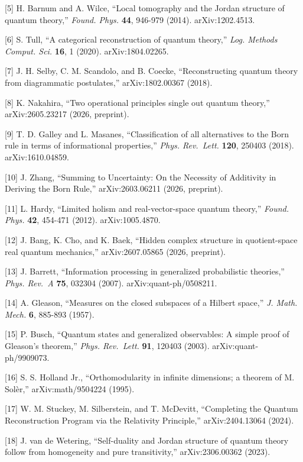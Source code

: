 \documentclass[
]{article}
\begin{document}
{[}5{]} H. Barnum and A. Wilce, ``Local tomography and the Jordan
structure of quantum theory,'' \emph{Found. Phys.} \textbf{44}, 946-979
(2014). arXiv:1202.4513.

{[}6{]} S. Tull, ``A categorical reconstruction of quantum theory,''
\emph{Log. Methods Comput. Sci.} \textbf{16}, 1 (2020).
arXiv:1804.02265.

{[}7{]} J. H. Selby, C. M. Scandolo, and B. Coecke, ``Reconstructing
quantum theory from diagrammatic postulates,'' arXiv:1802.00367 (2018).

{[}8{]} K. Nakahira, ``Two operational principles single out quantum
theory,'' arXiv:2605.23217 (2026, preprint).

{[}9{]} T. D. Galley and L. Masanes, ``Classification of all
alternatives to the Born rule in terms of informational properties,''
\emph{Phys. Rev.~Lett.} \textbf{120}, 250403 (2018). arXiv:1610.04859.

{[}10{]} J. Zhang, ``Summing to Uncertainty: On the Necessity of
Additivity in Deriving the Born Rule,'' arXiv:2603.06211 (2026,
preprint).

{[}11{]} L. Hardy, ``Limited holism and real-vector-space quantum
theory,'' \emph{Found. Phys.} \textbf{42}, 454-471 (2012).
arXiv:1005.4870.

{[}12{]} J. Bang, K. Cho, and K. Baek, ``Hidden complex structure in
quotient-space real quantum mechanics,'' arXiv:2607.05865 (2026,
preprint).

{[}13{]} J. Barrett, ``Information processing in generalized
probabilistic theories,'' \emph{Phys. Rev.~A} \textbf{75}, 032304
(2007). arXiv:quant-ph/0508211.

{[}14{]} A. Gleason, ``Measures on the closed subspaces of a Hilbert
space,'' \emph{J. Math. Mech.} \textbf{6}, 885-893 (1957).

{[}15{]} P. Busch, ``Quantum states and generalized observables: A
simple proof of Gleason's theorem,'' \emph{Phys. Rev.~Lett.}
\textbf{91}, 120403 (2003). arXiv:quant-ph/9909073.

{[}16{]} S. S. Holland Jr., ``Orthomodularity in infinite dimensions; a
theorem of M. Solèr,'' arXiv:math/9504224 (1995).

{[}17{]} W. M. Stuckey, M. Silberstein, and T. McDevitt, ``Completing
the Quantum Reconstruction Program via the Relativity Principle,''
arXiv:2404.13064 (2024).

{[}18{]} J. van de Wetering, ``Self-duality and Jordan structure of
quantum theory follow from homogeneity and pure transitivity,''
arXiv:2306.00362 (2023).
\end{document}
